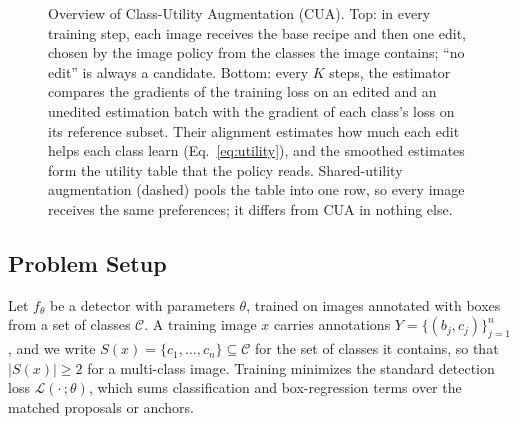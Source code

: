 \documentclass[conference]{IEEEtran}
\begin{document}
\begin{figure}[t]
\caption{Overview of Class-Utility Augmentation (CUA). Top: in every training step, each image receives the base recipe and then one edit, chosen by the image policy from the classes the image contains; ``no edit'' is always a candidate. Bottom: every $K$ steps, the estimator compares the gradients of the training loss on an edited and an unedited estimation batch with the gradient of each class's loss on its reference subset. Their alignment estimates how much each edit helps each class learn (Eq.~\eqref{eq:utility}), and the smoothed estimates form the utility table that the policy reads. Shared-utility augmentation (dashed) pools the table into one row, so every image receives the same preferences; it differs from CUA in nothing else.}
\label{fig:framework}
\end{figure}

\subsection{Problem Setup}
\label{sec:method_setup}

Let $f_\theta$ be a detector with parameters $\theta$, trained on images annotated with boxes from a set of classes $\mathcal{C}$. A training image $x$ carries annotations $Y=\{(b_j,c_j)\}_{j=1}^{n}$, and we write $S(x)=\{c_1,\dots,c_n\}\subseteq\mathcal{C}$ for the set of classes it contains, so that $|S(x)|\geq 2$ for a multi-class image. Training minimizes the standard detection loss $\mathcal{L}(\cdot\,;\theta)$, which sums classification and box-regression terms over the matched proposals or anchors.
\end{document}
